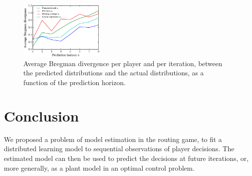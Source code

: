 \documentclass{sig-alternate-ipsn13}
\begin{document}
\begin{figure}[h!]
  \centering
  \includegraphics[width=0.37\textwidth]{images/predictions_divergence}
  \caption{\footnotesize Average Bregman divergence per player and per iteration, between the predicted distributions and the actual distributions, as a function of the prediction horizon.\vspace{-.1in}}
  \label{fig:predictions_divergence}
\end{figure}



\section{Conclusion}
\label{sec:conclusion}
We proposed a problem of model estimation in the routing game, to fit a distributed learning model to sequential observations of player decisions. The estimated model can then be used to predict the decisions at future iterations, or, more generally, as a plant model in an optimal control problem.
\end{document}
